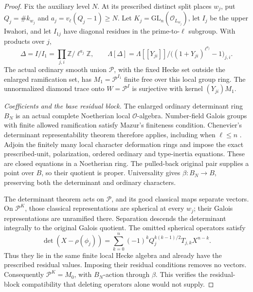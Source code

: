 \begin{proof}
Fix the auxiliary level \(N\).  At its prescribed distinct split
places \(w_j\), put \(Q_j=\#k_{w_j}\) and
\(a_j=v_\ell(Q_j-1)\ge N\).
Let \(K_j=\mathrm{GL}_n(\mathcal O_{L_{w_j}})\), let \(I_j\)
be the upper Iwahori, and let \(I_{1j}\) have diagonal residues
in the prime-to-\(\ell\) subgroup.  With products over \(j\),
\[
 \Delta=I/I_1=\prod_{j,i}\mathbb Z/\ell^{a_j}\mathbb Z,\qquad
 \Lambda[\Delta]=
 \Lambda[[Y_{ji}]]/
       \bigl((1+Y_{ji})^{\ell^{a_j}}-1\bigr)_{j,i}.
\]
The actual ordinary smooth union \(\mathcal P\), with the fixed
Hecke set outside the enlarged ramification set, has
\(M_1=\mathcal P^{I_1}\) finite free over this local group ring.
The unnormalized diamond trace onto \(W=\mathcal P^I\) is
surjective with kernel \((Y_{ji})M_1\).

\emph{Coefficients and the base residual block.}
The enlarged ordinary determinant ring \(B_N\) is an actual complete
Noetherian local \(\mathcal O\)-algebra.  Number-field Galois groups
with finite allowed ramification satisfy Mazur's finiteness
condition.  Chenevier's determinant representability theorem
therefore applies, including when \(\ell\le n\)
\cite[Propositions 3.3 and 3.7, Example 3.6]{SelmerTWChenevier}.
Adjoin the finitely many local character deformation rings and
impose the exact prescribed-unit, polarization, ordered ordinary
and type-inertia equations.  These are closed equations in a
Noetherian ring.  The pulled-back original pair supplies a point
over \(B\), so their quotient is proper.  Universality gives
\(\beta:B_N\to B\), preserving both the determinant and ordinary
characters.

The determinant theorem acts on \(\mathcal P\), and its good
classical maps separate vectors.  On \(\mathcal P^K\), those
classical representations are spherical at every \(w_j\); their
Galois representations are unramified there.  Separation descends
the determinant integrally to the original Galois quotient.
The omitted spherical operators satisfy
\[
 \det(X-\rho(\phi_j))
   =\sum_{k=0}^n(-1)^k Q_j^{k(k-1)/2}T_{j,k}X^{n-k}.
\]
Thus they lie in the same finite local Hecke algebra and already
have the prescribed residual values.  Imposing their residual
conditions removes no vectors.  Consequently
\(\mathcal P^K=M_0\), with \(B_N\)-action through \(\beta\).
This verifies the residual-block compatibility that deleting
operators alone would not supply.


\end{proof}
